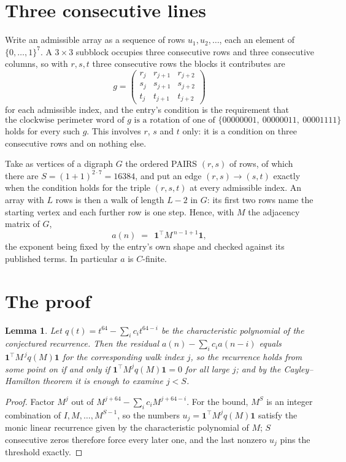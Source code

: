 \documentclass[11pt,a4paper]{article}
\theoremstyle{plain}
\newtheorem{lemma}[theorem]{Lemma}
\theoremstyle{definition}
\begin{document}
\section{Three consecutive lines}

Write an admissible array as a sequence of rows $u_1,u_2,\dots$, each an element of
$\{0,\dots,1\}^{7}$. A $3\times3$ subblock occupies three consecutive rows and
three consecutive columns, so with $r,s,t$ three consecutive rows the blocks it
contributes are
\[
g=\begin{pmatrix}r_j&r_{j+1}&r_{j+2}\\ s_j&s_{j+1}&s_{j+2}\\ t_j&t_{j+1}&t_{j+2}\end{pmatrix}
\]
for each admissible index, and the entry's condition is the requirement that
\[
\text{the clockwise perimeter word of }g\text{ is a rotation of one of }\{00000001,\ 00000011,\ 00001111\}
\]
holds for every such $g$. This involves $r$, $s$ and $t$ only: it is a condition on
three consecutive rows and on nothing else.

Take as vertices of a digraph $G$ the ordered PAIRS $(r,s)$ of rows, of which there are
$S=(1+1)^{2\cdot7}=16384$, and put an edge $(r,s)\to(s,t)$ exactly when the condition
holds for the triple $(r,s,t)$ at every admissible index. An array with $L$ rows is then a
walk of length $L-2$ in $G$: its first two rows name the starting vertex and each further
row is one step. Hence, with $M$ the adjacency matrix of $G$,
\[
a(n)\;=\;\,\mathbf{1}^{\!\top}M^{\,n-1+1}\mathbf{1},
\]
the exponent being fixed by the entry's own shape and checked against its published terms.
In particular $a$ is $C$-finite.

\section{The proof}

\begin{lemma}\label{lem:crit}
Let $q(t)=t^{64}-\sum_i c_it^{64-i}$ be the characteristic polynomial of the
conjectured recurrence. Then the residual $a(n)-\sum_ic_ia(n-i)$ equals
$\mathbf{1}^{\!\top}M^{\,j}q(M)\mathbf{1}$ for the corresponding walk index
$j$, so the recurrence holds from some point on if and only if
$\mathbf{1}^{\!\top}M^{j}q(M)\mathbf{1}=0$ for all large $j$; and by the
Cayley--Hamilton theorem it is enough to examine $j<S$.
\end{lemma}

\begin{proof}
Factor $M^{j}$ out of $M^{j+64}-\sum_ic_iM^{j+64-i}$. For the bound, $M^{S}$
is an integer combination of $I,M,\dots,M^{S-1}$, so the numbers
$u_j=\mathbf{1}^{\!\top}M^{j}q(M)\mathbf{1}$ satisfy the monic linear recurrence given by
the characteristic polynomial of $M$; $S$ consecutive zeros therefore force every later one,
and the last nonzero $u_j$ pins the threshold exactly.
\end{proof}
\end{document}
